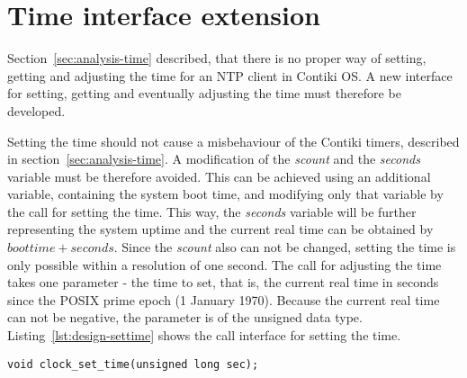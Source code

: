 
\section{Time interface extension}\label{sec:analysis-interface}
Section~\ref{sec:analysis-time} described, that there is no proper
way of setting, getting and adjusting the time for an NTP client in Contiki OS.
A new interface for setting, getting and eventually adjusting the time
must therefore be developed.

Setting the time should not cause a misbehaviour of the Contiki timers,
described in section~\ref{sec:analysis-time}.
A modification of the {\it{scount}} and the {\it{seconds}} variable must be therefore avoided.
This can be achieved using an additional variable, containing the system boot time,
and modifying only that variable by the call for setting the time.
This way, the {\it{seconds}} variable will be further representing the system uptime
and the current real time can be obtained by $boottime + seconds$.
Since the {\it{scount}} also can not be changed, setting the time is only possible
within a resolution of one second.
The call for adjusting the time takes one parameter - the time to set, that is, the current real time in
seconds since the POSIX prime epoch (1 January 1970).
Because the current real time can not be negative, the parameter is of the unsigned data type.
Listing~\ref{lst:design-settime} shows the call interface for setting the time.
\begin{lstlisting}[caption={Call interface for setting the time},label={lst:design-settime}]
void clock_set_time(unsigned long sec);
\end{lstlisting}

